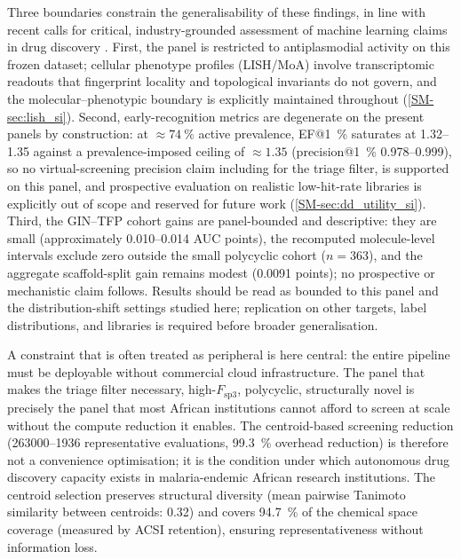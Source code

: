 \documentclass[11pt,a4paper]{article}
\begin{document}
Three boundaries constrain the generalisability of these findings, in line with recent calls for critical, industry-grounded assessment of machine learning claims in drug discovery \citep{wognum2024call}. First, the panel is restricted to antiplasmodial activity on this frozen dataset; cellular phenotype profiles (LISH/MoA) involve transcriptomic readouts that fingerprint locality and topological invariants do not govern, and the molecular--phenotypic boundary is explicitly maintained throughout (\cref{SM-sec:lish_si}). Second, early-recognition metrics are degenerate on the present panels by construction: at $\approx\qty{74}{\percent}$ active prevalence, EF@\qty{1}{\percent} saturates at \numrange{1.32}{1.35} against a prevalence-imposed ceiling of $\approx\num{1.35}$ (precision@\qty{1}{\percent} \numrange{0.978}{0.999}), so no virtual-screening precision claim including for the triage filter, is supported on this panel, and prospective evaluation on realistic low-hit-rate libraries is explicitly out of scope and reserved for future work (\cref{SM-sec:dd_utility_si}). Third, the GIN--TFP cohort gains are panel-bounded and descriptive: they are small (approximately \num{0.010}--\num{0.014} AUC points), the recomputed molecule-level intervals exclude zero outside the small polycyclic cohort ($n=\num{363}$), and the aggregate scaffold-split gain remains modest (\num{0.0091} points); no prospective or mechanistic claim follows. Results should be read as bounded to this panel and the distribution-shift settings studied here; replication on other targets, label distributions, and libraries is required before broader generalisation.

A constraint that is often treated as peripheral is here central: the entire pipeline must be deployable without commercial cloud infrastructure. The panel that makes the triage filter necessary, high-$F_{\mathrm{sp3}}$, polycyclic, structurally novel is precisely the panel that most African institutions cannot afford to screen at scale without the compute reduction it enables. The centroid-based screening reduction (\numrange{263000}{1936} representative evaluations, \qty{99.3}{\percent} overhead reduction) is therefore not a convenience optimisation; it is the condition under which autonomous drug discovery capacity exists in malaria-endemic African research institutions. The centroid selection preserves structural diversity (mean pairwise Tanimoto similarity between centroids: \num{0.32}) and covers \qty{94.7}{\percent} of the chemical space coverage (measured by ACSI retention), ensuring representativeness without information loss.
\end{document}
